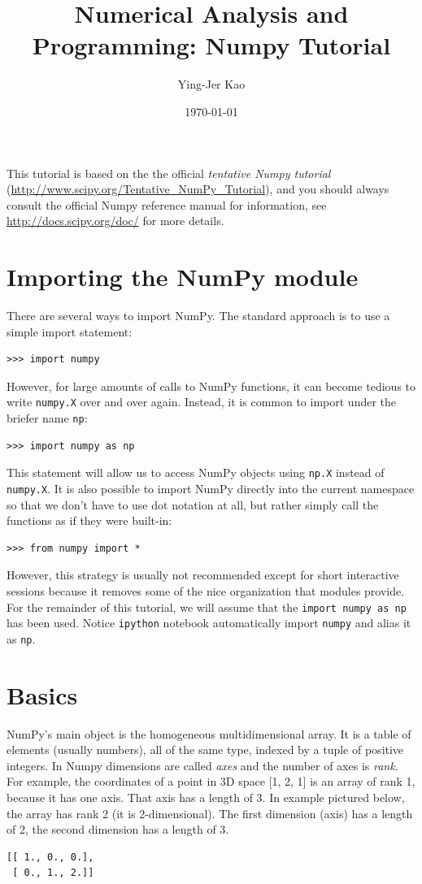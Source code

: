 \documentclass[12pt]{article}
\begin{document}
\title{Numerical Analysis and Programming: Numpy Tutorial}
\author{Ying-Jer Kao}
\date{\today}

\maketitle
This tutorial is based on the the official \textit{tentative Numpy tutorial} (\url{http://www.scipy.org/Tentative_NumPy_Tutorial}), and you should always consult the official Numpy reference manual for information, see  \url{http://docs.scipy.org/doc/} for more details.

\section{Importing the NumPy module }
There are several ways to import NumPy. The standard approach is to use a simple import 
statement: 
\footnotesize
\begin{Verbatim}[frame=single]
>>> import numpy 
\end{Verbatim}
\normalsize
However, for large amounts of calls to NumPy functions, it can become tedious to write 
\texttt{numpy.X} over and over again. Instead, it is common to import under the briefer name \texttt{np}: 
\footnotesize
\begin{Verbatim}[frame=single]
>>> import numpy as np
\end{Verbatim}
\normalsize
This statement will allow us to access NumPy objects using \texttt{np.X} instead of \texttt{numpy.X}. It is 
also possible to import NumPy directly into the current namespace so that we don't have to use 
dot notation at all, but rather simply call the functions as if they were built-in: 
\footnotesize
\begin{Verbatim}[frame=single]
>>> from numpy import *
\end{Verbatim} 
\normalsize

However, this strategy is usually not recommended except for short interactive sessions because it 
removes some of the nice organization that modules provide. For the remainder of this tutorial, 
we will assume that the \texttt{import numpy as np} has been used. Notice \texttt{ipython} notebook automatically import  \texttt{numpy} and alias it as \texttt{np}.

\section{Basics}
NumPy's main object is the homogeneous multidimensional array. It is a table of elements (usually numbers), all of the same type, indexed by a tuple of positive integers. In Numpy dimensions are called \textit{axes} and the number of axes is \textit{rank}.
For example, the coordinates of a point in 3D space [1, 2, 1] is an array of rank 1, because it has one axis. That axis has a length of 3. In example pictured below, the array has rank 2 (it is 2-dimensional). The first dimension (axis) has a length of 2, the second dimension has a length of 3.
\footnotesize
\begin{Verbatim}[frame=single]
[[ 1., 0., 0.],
 [ 0., 1., 2.]]
 \end{Verbatim}
 \normalsize
 
\end{document}

